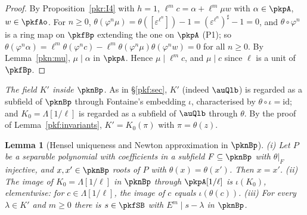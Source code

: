 \documentclass[10pt]{amsart}
\newtheorem{lemma}[theorem]{Lemma}
\theoremstyle{definition}
\theoremstyle{remark}
\begin{document}
\begin{proof}
By Proposition~\ref{pkr:I4} with $h=1$, $\ell^mc=\alpha+\ell^m\mu w$ with $\alpha\in\pkpA$, $w\in\pkfAo$.
For $n\ge0$, $\theta(\varphi^n\mu)=\theta([\varepsilon^{\ell^n}])-1=(\varepsilon^{\ell^n})^\sharp-1=0$, and
$\theta\circ\varphi^n$ is a ring map on $\pkfBp$ extending the one on $\pkpA$ (P1); so
$\theta(\varphi^n\alpha)=\ell^m\theta(\varphi^nc)-\ell^m\theta(\varphi^n\mu)\theta(\varphi^nw)=0$ for all
$n\ge0$. By Lemma~\ref{pkn:mu}, $\mu\mid\alpha$ in $\pkpA$. Hence $\mu\mid\ell^mc$, and $\mu\mid c$ since
$\ell$ is a unit of $\pkfBp$.
\end{proof}

\emph{The field $K'$ inside $\pknBp$.} As in \S\ref{pkf:sec}, $K'$ (indeed $\auQlb$) is regarded as a
subfield of $\pknBp$ through Fontaine's embedding $\iota$, characterised by $\theta\circ\iota=\mathrm{id}$;
and $K_0=\Lambda[1/\ell]$ is regarded as a subfield of $\auQlb$ through $\theta$. By the proof of
Lemma~\ref{pkf:invariants}, $K'=K_0(\pi)$ with $\pi=\theta(z)$.

\begin{lemma}[Hensel uniqueness and Newton approximation in $\pknBp$]\label{pkr:newton}
(i) Let $P$ be a separable polynomial with coefficients in a subfield $F\subseteq\pknBp$ with $\theta|_F$
injective, and $x,x'\in\pknBp$ roots of $P$ with $\theta(x)=\theta(x')$. Then $x=x'$.
(ii) The image of $K_0=\Lambda[1/\ell]$ in $\pknBp$ through $\pkpA[1/\ell]$ is $\iota(K_0)$, elementwise:
for $c\in\Lambda[1/\ell]$, the image of $c$ equals $\iota(\theta(c))$.
(iii) For every $\lambda\in K'$ and $m\ge0$ there is $s\in\pkfSB$ with $E^m\mid s-\lambda$ in $\pknBp$.
\end{lemma}
\end{document}
